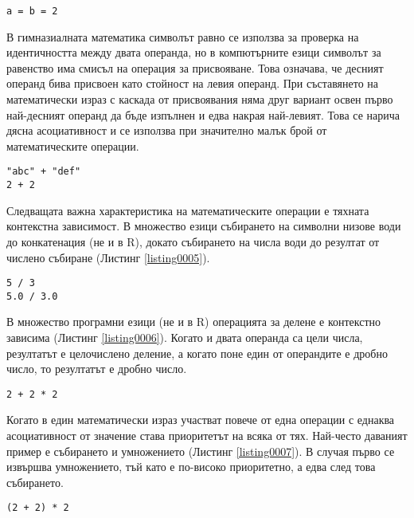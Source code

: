 \begin{lstlisting}[caption=Израз за каскадно присвояване, label=listing0004]
a = b = 2
\end{lstlisting}

В гимназиалната математика символът равно се използва за проверка на идентичността между двата операнда, но в компютърните езици символът за равенство има смисъл на операция за присвояване. Това означава, че десният операнд бива присвоен като стойност на левия операнд. При съставянето на математически израз с каскада от присвоявания няма друг вариант освен първо най-десният операнд да бъде изпълнен и едва накрая най-левият. Това се нарича дясна асоциативност и се използва при значително малък брой от математическите операции. 

\begin{lstlisting}[caption=Контекстна зависимост на опрациите, label=listing0005]
"abc" + "def"
2 + 2
\end{lstlisting}

Следващата важна характеристика на математическите операции е тяхната контекстна зависимост. В множество езици събирането на символни низове води до конкатенация (не и в R), докато събирането на числа води до резултат от числено събиране (Листинг \ref{listing0005}). 

\begin{lstlisting}[caption=Контекстна зависимост на опрацията за делене, label=listing0006]
5 / 3
5.0 / 3.0
\end{lstlisting}

В множество програмни езици (не и в R) операцията за делене е контекстно зависима (Листинг \ref{listing0006}). Когато и двата операнда са цели числа, резултатът е целочислено деление, а когато поне един от операндите е дробно число, то резултатът е дробно число. 

\begin{lstlisting}[caption=Приоритет на операциите, label=listing0007]
2 + 2 * 2
\end{lstlisting}

Когато в един математически израз участват повече от една операции с еднаква асоциативност от значение става приоритетът на всяка от тях. Най-често даваният пример е събирането и умножението (Листинг \ref{listing0007}). В случая първо се извършва умножението, тъй като е по-високо приоритетно, а едва след това събирането. 

\begin{lstlisting}[caption=Смяна на приоритета, label=listing0008]
(2 + 2) * 2
\end{lstlisting}

